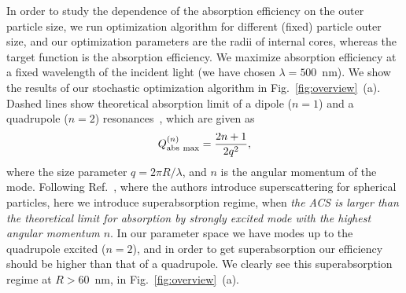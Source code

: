 \documentclass[aps,prl,twocolumn,showpacs,superscriptaddress,groupedaddress]{revtex4-1}  %
\begin{document}
\begin{figure}
\end{figure}
%
In order to study the dependence of the absorption efficiency on the
outer particle size, we run optimization algorithm for different
(fixed) particle outer size, and our optimization parameters are the
radii of internal cores, whereas the target function is the absorption
efficiency. We maximize absorption efficiency at a fixed wavelength of
the incident light (we have chosen $\lambda=500$~nm). We show the
results of our stochastic optimization algorithm in
Fig.~\ref{fig:overview}~(a).  Dashed lines show theoretical absorption
limit of a dipole ($n=1$) and a quadrupole ($n=2$)
resonances~\cite{Tribelsky-2011}, which are given as $$Q^{(n)}_{\rm
  abs\ max}=\frac{2n+1}{2q^2},$$ where the size parameter $q=2\pi
R/\lambda$, and $n$ is the angular momentum of the mode. Following
Ref.~\cite{Fan-2011}, where the authors introduce superscattering for
spherical particles, here we introduce superabsorption regime, when
{\em the ACS is larger than the theoretical limit for absorption by
  strongly excited mode with the highest angular momentum $n$}. In our
parameter space we have modes up to the quadrupole excited ($n=2$),
and in order to get superabsorption our efficiency should be higher
than that of a quadrupole. We clearly see this superabsorption regime
at $R>60$~nm, in Fig.~\ref{fig:overview}~(a).
\end{document}
